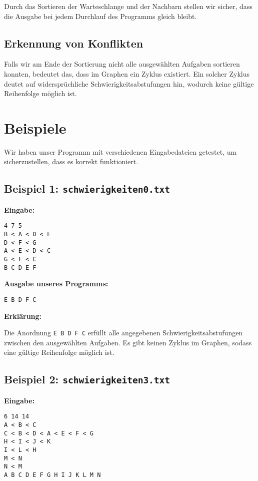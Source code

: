 \documentclass{article}
\begin{document}
Durch das Sortieren der Warteschlange und der Nachbarn stellen wir sicher, dass die Ausgabe bei jedem Durchlauf des Programms gleich bleibt.

\subsection{Erkennung von Konflikten}

Falls wir am Ende der Sortierung nicht alle ausgewählten Aufgaben sortieren konnten, bedeutet das, dass im Graphen ein Zyklus existiert. Ein solcher Zyklus deutet auf widersprüchliche Schwierigkeitsabstufungen hin, wodurch keine gültige Reihenfolge möglich ist.

\section{Beispiele}

Wir haben unser Programm mit verschiedenen Eingabedateien getestet, um sicherzustellen, dass es korrekt funktioniert.

\subsection{Beispiel 1: \texttt{schwierigkeiten0.txt}}

\textbf{Eingabe:}

\begin{verbatim}
4 7 5
B < A < D < F
D < F < G
A < E < D < C
G < F < C
B C D E F
\end{verbatim}

\textbf{Ausgabe unseres Programms:}

\begin{verbatim}
E B D F C
\end{verbatim}

\textbf{Erklärung:}

Die Anordnung \texttt{E B D F C} erfüllt alle angegebenen Schwierigkeitsabstufungen zwischen den ausgewählten Aufgaben. Es gibt keinen Zyklus im Graphen, sodass eine gültige Reihenfolge möglich ist.

\subsection{Beispiel 2: \texttt{schwierigkeiten3.txt}}

\textbf{Eingabe:}

\begin{verbatim}
6 14 14
A < B < C
C < B < D < A < E < F < G
H < I < J < K
I < L < H
M < N
N < M
A B C D E F G H I J K L M N
\end{verbatim}
\end{document}
